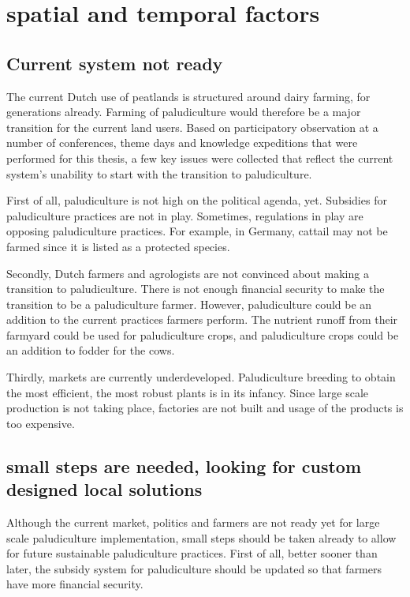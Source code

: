 \documentclass[a4paper,12pt]{scrbook}
\begin{document}
{%

\section{spatial and temporal factors}

\subsection{Current system not ready}
The current Dutch use of peatlands is structured around dairy farming, for generations already. Farming of paludiculture would therefore be a major transition for the current land users. Based on participatory observation at a number of conferences, theme days and knowledge expeditions that were performed for this thesis, a few key issues were collected that reflect the current system's unability to start with the transition to paludiculture. 

First of all, paludiculture is not high on the political agenda, yet. Subsidies for paludiculture practices are not in play. Sometimes, regulations in play are opposing paludiculture practices. For example, in Germany, cattail may not be farmed since it is listed as a protected species. 

Secondly, Dutch farmers and agrologists are not convinced about making a transition to paludiculture. There is not enough financial security to make the transition to be a paludiculture farmer. However, paludiculture could be an addition to the current practices farmers perform. The nutrient runoff from their farmyard could be used for paludiculture crops, and paludiculture crops could be an addition to fodder for the cows. 

Thirdly, markets are currently underdeveloped. Paludiculture breeding to obtain the most efficient, the most robust plants is in its infancy. Since large scale production is not taking place, factories are not built and usage of the products is too expensive. 

\subsection{small steps are needed, looking for custom designed local solutions }
Although the current market, politics and farmers are not ready yet for large scale paludiculture implementation, small steps should be taken already to allow for future sustainable paludiculture practices. First of all, better sooner than later, the subsidy system for paludiculture should be updated so that farmers have more financial security. 

}
\end{document}

